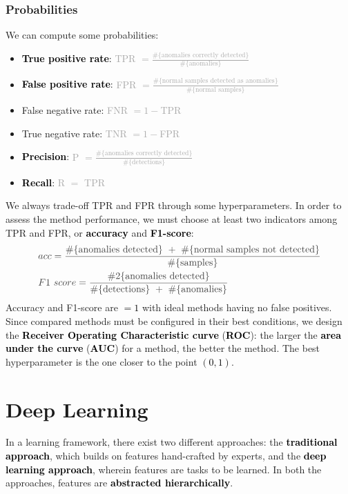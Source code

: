 \documentclass{article}
\newcommand{\bb}[1]{\textcolor{black}{\textbf{#1}}}
\newcommand{\rr}[1]{\textcolor{black}{#1}}
\begin{document}
\subsubsection{Probabilities}
We can compute some probabilities:
\begin{itemize}
    \item \bb{True positive rate}: \textcolor{darkgray}{TPR $= \displaystyle\frac{\#\{\text{anomalies correctly detected}\}}{\#\{\text{anomalies}\}}$}
    \item \bb{False positive rate}: \textcolor{darkgray}{FPR $= \displaystyle\frac{\#\{\text{normal samples detected as anomalies}\}}{\#\{\text{normal samples}\}}$}
    \item False negative rate: \textcolor{darkgray}{FNR $= 1 - $TPR}
    \item True negative rate: \textcolor{darkgray}{TNR $ = 1 - $FPR}
    \item \bb{Precision}: \textcolor{darkgray}{P $= \displaystyle\frac{\#\{\text{anomalies correctly detected}\}}{\#\{\text{detections}\}}$}
    \item \bb{Recall}: \textcolor{darkgray}{R $=$ TPR}
\end{itemize}
We always trade-off TPR and FPR through some hyperparameters. In order to assess the method performance, we must choose at least two indicators among TPR and FPR, or \bb{accuracy} and \bb{F1-score}:
\begin{align*}
    &\textcolor{darkgray}{acc = \displaystyle\frac{\#\{\text{anomalies detected}\} \ + \ \#\{\text{normal samples not detected}\}}{\#\{\text{samples}\}}} \\
    &\textcolor{darkgray}{F1 \ score = \displaystyle\frac{\#2\{\text{anomalies detected}\}}{\#\{\text{detections}\} \ + \ \#\{\text{anomalies}\}}}
\end{align*}
Accuracy and F1-score are \rr{$= 1$} with ideal methods having no false positives. Since compared methods must be configured in their best conditions, we design the \bb{Receiver Operating Characteristic curve} (\bb{ROC}): the larger the \bb{area under the curve} (\bb{AUC}) for a method, the better the method. The best hyperparameter is the one closer to the point \rr{$(0,1)$}.

\newpage

\section{Deep Learning}
In a learning framework, there exist two different approaches: the \bb{traditional approach}, which builds on features hand-crafted by experts, and the \bb{deep learning approach}, wherein features are tasks to be learned. In both the approaches, features are \bb{abstracted hierarchically}.
\end{document}
